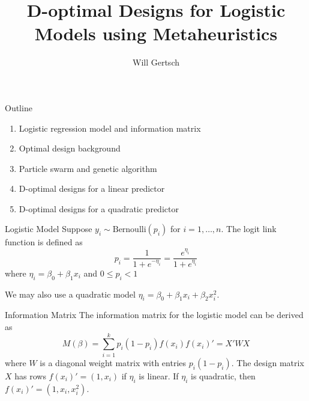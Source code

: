 \documentclass[11pt]{beamer}
\author{Will Gertsch}
\title{D-optimal Designs for Logistic Models using Metaheuristics}
\begin{document}
\begin{frame}
\titlepage
\end{frame}


\begin{frame}{Outline}
\begin{enumerate}
\item Logistic regression model and information matrix
\item Optimal design background
\item Particle swarm and genetic algorithm
\item D-optimal designs for a linear predictor
\item D-optimal designs for a quadratic predictor
\end{enumerate}
\end{frame}

\begin{frame}{Logistic Model}
Suppose $y_i \sim \text{Bernoulli}(p_i)$ for $i = 1, \dots, n$. The logit link function is defined as
$$
p_i = \frac{1}{1+e^{-\eta_i}} = \frac{e^{\eta_i}}{1+e^{\eta_i}}
$$
where $\eta_i = \beta_0  + \beta_1 x_{i}$
and $0 \leq p_i < 1$

We may also use a quadratic model $\eta_i = \beta_0  + \beta_1 x_{i} + \beta_2 x_i^2$.
\end{frame}

\begin{frame}{Information Matrix}
The information matrix for the logistic model can be derived as 
$$
M(\beta) = \sum_{i=1}^k p_i (1-p_i) f(x_i) f(x_i)' = X'WX
$$
where $W$ is a diagonal weight matrix with entries $p_i (1-p_i)$. The design matrix $X$ has rows $f(x_i)' = (1, x_i)$ if $\eta_i$ is linear. If $\eta_i$ is quadratic, then $f(x_i)' = (1,x_i,x_i^2)$. 
\end{frame}

%
\end{document}

